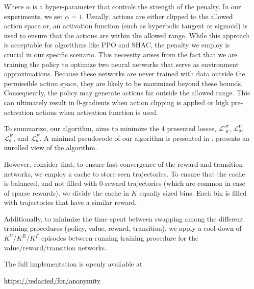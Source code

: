     Where $\alpha$ is a hyper-parameter that controls the strength of the penalty. In our experiments, we set $\alpha=1$. Usually, actions are either clipped to the allowed action space or, an activation function (such as hyperbolic tangent or sigmoid) is used to ensure that the actions are within the allowed range. While this approach is acceptable for algorithms like PPO and SHAC, the penalty we employ is crucial in our specific scenario. This necessity arises from the fact that we are training the policy to optimize two neural networks that serve as environment approximations. Because these networks are never trained with data outside the permissible action space, they are likely to be maximized beyond these bounds. Consequently, the policy may generate actions far outside the allowed range. This can ultimately result in 0-gradients when action clipping is applied or high pre-activation actions when activation function is used. 

To summarize, our algorithm, aims to minimize the 4 presented losses, $\mathcal{L'}_\theta^{\pi}$, $\mathcal{L}_\theta^V$, $\mathcal{L}_\theta^R$, and $\mathcal{L}_\theta^F$. A minimal pseudocode of our algorithm is presented in .  presents an unrolled view of the \fname{} algorithm.

However, consider that, to ensure fast convergence of the reward and transition networks, we employ a cache to store seen trajectories. To ensure that the cache is balanced, and not filled with $0$-reward trajectories (which are common in case of sparse rewards), we divide the cache in $K$ equally sized bins. Each bin is filled with trajectories that have a similar reward. 

Additionally, to minimize the time spent between swapping among the different training procedures (policy, value, reward, transition), we apply a cool-down of $K^V$/$K^R$/$K^F$ episodes between running training procedure for the value/reward/transition networks. 

The full implementation is openly available at 
\begin{center}
\url{https://redacted/for/anonymity}
\end{center}




